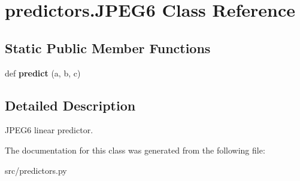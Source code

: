 \hypertarget{classpredictors_1_1JPEG6}{}\section{predictors.\+J\+P\+E\+G6 Class Reference}
\label{classpredictors_1_1JPEG6}
\subsection*{Static Public Member Functions}
\begin{DoxyCompactItemize}
\item 
\mbox{\label{classpredictors_1_1JPEG6_a81126d6ca3912e63d91b721cdb6abe43}} 
def {\bfseries predict} (a, b, c)
\end{DoxyCompactItemize}


\subsection{Detailed Description}
\begin{DoxyVerb}JPEG6 linear predictor.
\end{DoxyVerb}
 

The documentation for this class was generated from the following file\+:\begin{DoxyCompactItemize}
\item 
src/predictors.\+py\end{DoxyCompactItemize}
